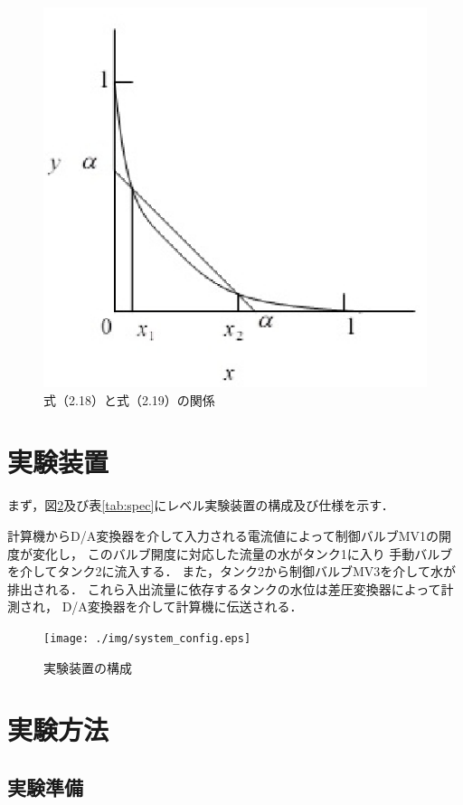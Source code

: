 \documentclass[11pt,a4paper]{jsarticle}
\begin{document}
\begin{figure}[b]
  \begin{center}
    \includegraphics[width=0.5\hsize]{./img/log_relation.eps}
  \end{center}
  \caption{式（2.18）と式（2.19）の関係}
  \label{fig:log}
\end{figure}

\section{実験装置}
\setcounter{equation}{0}
\setcounter{figure}{0}
\setcounter{table}{0}

まず，図\ref{fig:config}及び表\ref{tab:spec}にレベル実験装置の構成及び仕様を示す．

計算機からD/A変換器を介して入力される電流値によって制御バルブMV1の開度が変化し，
このバルブ開度に対応した流量の水がタンク1に入り
手動バルブを介してタンク2に流入する．
また，タンク2から制御バルブMV3を介して水が排出される．
これら入出流量に依存するタンクの水位は差圧変換器によって計測され，
D/A変換器を介して計算機に伝送される．\\

\begin{figure}[b]
  \begin{center}
    \texttt{[image: ./img/system\_config.eps]}
  \end{center}
  \caption{実験装置の構成}
  \label{fig:config}
\end{figure}

\section{実験方法}
\setcounter{equation}{0}
\setcounter{figure}{0}
\setcounter{table}{0}

\subsection{実験準備}
\end{document}
